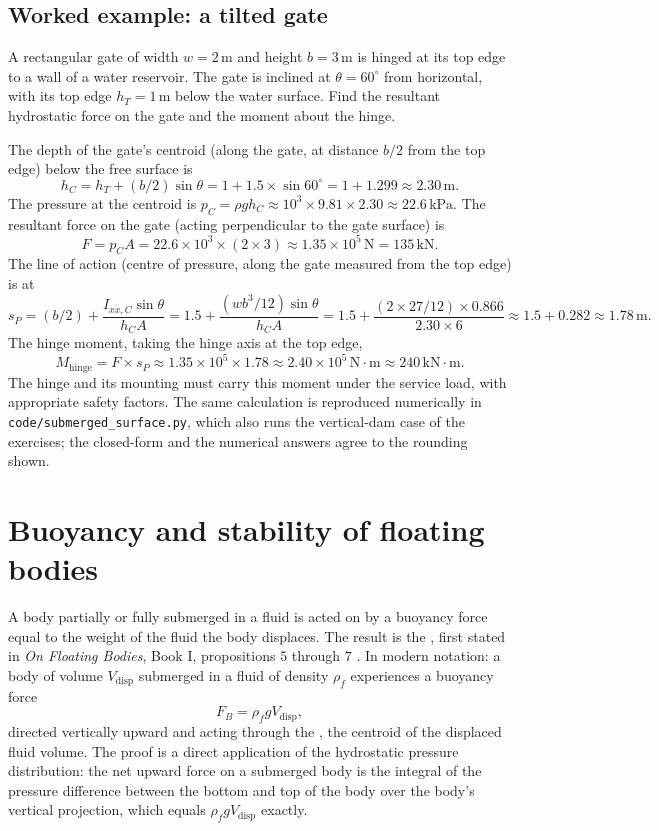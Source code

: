 \subsection{Worked example: a tilted gate}

A rectangular gate of width $w = 2\,\si{\meter}$ and height $b =
3\,\si{\meter}$ is hinged at its top edge to a wall of a water
reservoir. The gate is inclined at $\theta = 60^{\circ}$ from
horizontal, with its top edge $h_T = 1\,\si{\meter}$ below the
water surface. Find the resultant hydrostatic force on the gate
and the moment about the hinge.



The depth of the gate's centroid (along the gate, at distance
$b/2$ from the top edge) below the free surface is
\[
h_C = h_T + (b/2) \sin\theta = 1 + 1.5 \times \sin 60^{\circ}
= 1 + 1.299 \approx 2.30\,\si{\meter}.
\]
The pressure at the centroid is $p_C = \rho g h_C \approx 10^3
\times 9.81 \times 2.30 \approx 22.6\,\text{kPa}$. The resultant
force on the gate (acting perpendicular to the gate surface) is
\[
F = p_C A = 22.6 \times 10^3 \times (2 \times 3) \approx 1.35
\times 10^5\,\text{N} = 135\,\text{kN}.
\]
The line of action (centre of pressure, along the gate measured
from the top edge) is at
\[
s_P = (b/2) + \frac{I_{xx,C} \sin\theta}{h_C A}
= 1.5 + \frac{(w b^3/12) \sin\theta}{h_C A}
= 1.5 + \frac{(2 \times 27/12) \times 0.866}{2.30 \times 6}
\approx 1.5 + 0.282 \approx 1.78\,\si{\meter}.
\]
The hinge moment, taking the hinge axis at the top edge,
\[
M_{\text{hinge}} = F \times s_P \approx 1.35 \times 10^5 \times
1.78 \approx 2.40 \times 10^5\,\text{N}\cdot\text{m} \approx
240\,\text{kN}\cdot\text{m}.
\]
The hinge and its mounting must carry this moment under the
service load, with appropriate safety factors. The same calculation
is reproduced numerically in \texttt{code/submerged\_surface.py}, which
also runs the vertical-dam case of the exercises; the closed-form and
the numerical answers agree to the rounding shown.

\section{Buoyancy and stability of floating bodies}

A body partially or fully submerged in a fluid is acted on by a
buoyancy force equal to the weight of the fluid the body
displaces. The result is the ,
first stated in \emph{On Floating Bodies}, Book I, propositions
$5$ through $7$ \cite[Book I, Props.~5--7]{
hist:archimedes-floating}. In modern notation: a body of volume
$V_{\text{disp}}$ submerged in a fluid of density $\rho_f$
experiences a buoyancy force
\[
F_B = \rho_f g V_{\text{disp}},
\]
directed vertically upward and acting through the
, the centroid of the displaced fluid
volume. The proof is a direct application of the hydrostatic
pressure distribution: the net upward force on a submerged body
is the integral of the pressure difference between the bottom
and top of the body over the body's vertical projection, which
equals $\rho_f g V_{\text{disp}}$ exactly.

